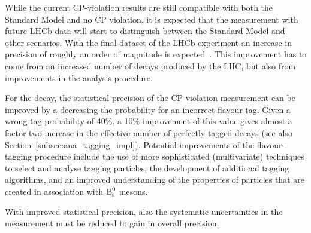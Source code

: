 While the current CP-violation results are still compatible with both the Standard Model and no CP violation, it is expected that the
measurement with future LHCb data will start to distinguish between the Standard Model and other scenarios. With the final dataset of the
LHCb experiment an increase in precision of roughly an order of magnitude is expected~\cite{CERN-LHCC-2011-001,LHCB-PAPER-2012-031}. This
improvement has to come from an increased number of decays produced by the LHC, but also from improvements in the analysis procedure.

For the \BstoJpsiphi{} decay, the statistical precision of the CP-violation measurement can be improved by a decreasing the probability for
an incorrect flavour tag. Given a wrong-tag probability of 40\%, a 10\% improvement of this value gives almost a factor two increase in the
effective number of perfectly tagged decays (see also Section~\ref{subsec:ana_tagging_impl}). Potential improvements of the flavour-tagging
procedure include the use of more sophisticated (multivariate) techniques to select and analyse tagging particles, the development of
additional tagging algorithms, and an improved understanding of the properties of particles that are created in association with $\text{B}_\text{s}^\text{0}$
mesons.

With improved statistical precision, also the systematic uncertainties in the measurement must be reduced to gain in overall precision. 
